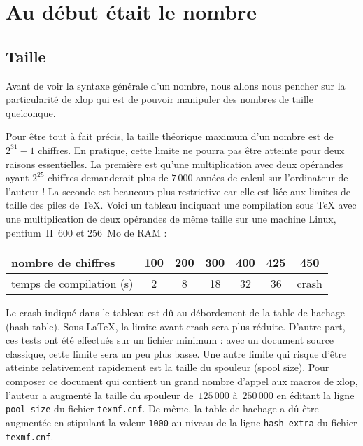 \documentclass[12pt]{report}
\newcommand\package[1]{\textsf{#1}}
\newcommand\file[1]{\texttt{#1}}
\begin{document}
\section{Au début était le nombre}
\label{sec:Au début etait le nombre}
\subsection{Taille}
\label{subsec:Taille}
Avant de voir la syntaxe générale d'un nombre, nous allons nous
pencher sur la particularité de \package{xlop} qui est de pouvoir
manipuler des nombres de taille quelconque.

Pour être tout à fait précis, la taille théorique
maximum d'un nombre est de $2^{31}-1$ chiffres.
En pratique, cette limite ne pourra pas être atteinte pour deux
raisons essentielles. La première est qu'une multiplication avec deux
opérandes ayant $2^{25}$ chiffres demanderait plus de $7\,000$ années
de calcul sur l'ordinateur de l'auteur ! La seconde est beaucoup plus
restrictive car elle est liée aux limites de taille des piles de
\TeX{}. Voici un tableau indiquant une compilation sous \TeX{} avec
une multiplication de deux opérandes de même taille sur une machine
Linux, pentium~II~600 et 256~Mo de RAM :
\begin{center}
  \begin{tabular}{|l|*{6}{c|}}
    \hline
    nombre de chiffres & 100 & 200 & 300 & 400 & 425 & 450 \\\hline
    temps de compilation (s) & 2 & 8 & 18 & 32 & 36 & crash \\\hline
  \end{tabular}
\end{center}
Le \og crash \fg{} indiqué dans le tableau est dû au débordement de la
table de hachage (hash table).  %
%
Sous \LaTeX{}, la limite avant crash sera plus réduite. D'autre part,
ces tests ont été effectués sur un fichier minimum : avec un document
source classique, cette limite sera un peu plus basse. Une autre
limite qui risque d'être atteinte relativement rapidement est la
taille du spouleur (spool size).  %
Pour composer ce document qui contient un grand nombre d'appel aux
macros de \package{xlop}, l'auteur a augmenté la taille du spouleur
de~$125\,000$ à~$250\,000$ en éditant la ligne \verb+pool_size+ du
fichier \file{texmf.cnf}. De même, la table de hachage a dû être
augmentée en stipulant la valeur \texttt{1000} au niveau de la ligne
\verb+hash_extra+ du fichier \file{texmf.cnf}.
\end{document}
